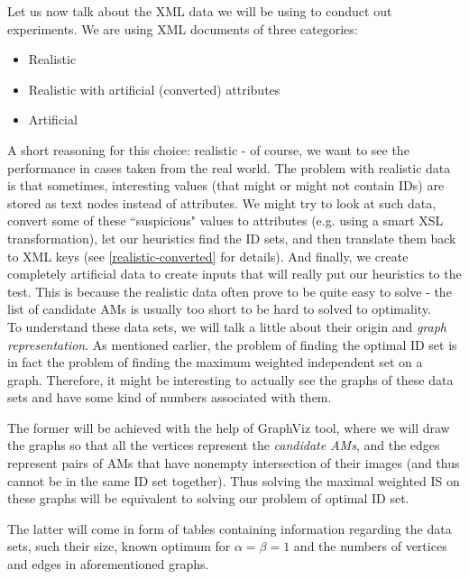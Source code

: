 \documentclass[a4paper,12pt,oneside]{report}
\theoremstyle{definition}
\begin{document}
Let us now talk about the XML data we will be using to conduct out experiments. We are using XML documents of three categories:

\begin{itemize}
	\item Realistic 
	\item Realistic with artificial (converted) attributes
	\item Artificial
\end{itemize}

A short reasoning for this choice: realistic - of course, we want to see the performance in cases taken from the real world. The problem with realistic data is that sometimes, interesting values (that might or might not contain IDs) are stored as text nodes %
instead of attributes. We might try to look at such data, convert some of these ``suspicious" values to attributes (e.g. using a smart XSL transformation), let our heuristics find the ID sets, and then translate them back to XML keys (see \ref{realistic-converted} for details).
And finally, we create completely artificial data to create inputs that will really put our heuristics to the test. This is because the realistic data often prove to be quite easy to solve - the list of candidate AMs is usually too short to be hard to solved to optimality.\\

To understand these data sets, we will talk a little about their origin and \textit{graph representation}. As mentioned earlier, %
the problem of finding the optimal ID set is in fact the problem of finding the maximum weighted independent set on a graph. Therefore, it might be interesting to actually see the graphs of these data sets and have some kind of numbers associated with them.

The former will be achieved with the help of GraphViz tool, %
where we will draw the graphs so that all the vertices represent the \textit{candidate AMs}, and the edges represent pairs of AMs that have nonempty intersection of their images (and thus cannot be in the same ID set together). Thus solving the maximal weighted IS on these graphs will be equivalent to solving our problem of optimal ID set.

The latter will come in form of tables containing information regarding the data sets, such their size, known optimum for $\alpha = \beta = 1$ and the numbers of vertices and edges in aforementioned graphs.
\end{document}
